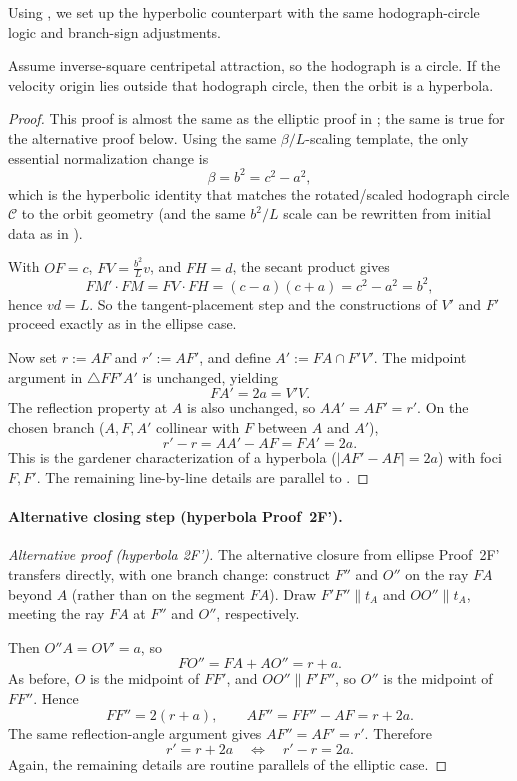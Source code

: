 Using , we set up the hyperbolic counterpart with the same hodograph-circle logic and branch-sign adjustments.

\begin{proposition}
Assume inverse-square centripetal attraction, so the hodograph is a circle. If the velocity origin lies outside that hodograph circle, then the orbit is a hyperbola.
\end{proposition}

\begin{proof}
This proof is almost the same as the elliptic proof in ; the same is true for the alternative proof below. Using the same \(\beta/L\)-scaling template, the only essential normalization change is
\[
  \beta=b^2=c^2-a^2,
\]
which is the hyperbolic identity that matches the rotated/scaled hodograph circle \(\mathcal C\) to the orbit geometry (and the same \(b^2/L\) scale can be rewritten from initial data as in ).

With \(OF=c\), \(FV=\frac{b^2}{L}v\), and \(FH=d\), the secant product gives
\[
  FM'\cdot FM=FV\cdot FH=(c-a)(c+a)=c^2-a^2=b^2,
\]
hence \(vd=L\). So the tangent-placement step and the constructions of \(V'\) and \(F'\) proceed exactly as in the ellipse case.

Now set \(r:=AF\) and \(r':=AF'\), and define \(A':=FA\cap F'V'\). The midpoint argument in \(\triangle FF'A'\) is unchanged, yielding
\[
  FA'=2a=V'V.
\]
The reflection property at \(A\) is also unchanged, so \(AA'=AF'=r'\). On the chosen branch (\(A,F,A'\) collinear with \(F\) between \(A\) and \(A'\)),
\[
  r'-r = AA'-AF = FA' = 2a.
\]
This is the gardener characterization of a hyperbola (\(\lvert AF'-AF\rvert=2a\)) with foci \(F,F'\). The remaining line-by-line details are parallel to .
\end{proof}

\paragraph{Alternative closing step (hyperbola Proof~2F').}
\begin{proof}[Alternative proof (hyperbola 2F')]
The alternative closure from ellipse Proof~2F' transfers directly, with one branch change: construct \(F''\) and \(O''\) on the ray \(FA\) beyond \(A\) (rather than on the segment \(FA\)). Draw \(F'F''\parallel t_A\) and \(OO''\parallel t_A\), meeting the ray \(FA\) at \(F''\) and \(O''\), respectively.

Then \(O''A=OV'=a\), so
\[
  FO''=FA+AO''=r+a.
\]
As before, \(O\) is the midpoint of \(FF'\), and \(OO''\parallel F'F''\), so \(O''\) is the midpoint of \(FF''\). Hence
\[
  FF''=2(r+a),
  \qquad
  AF''=FF''-AF=r+2a.
\]
The same reflection-angle argument gives \(AF''=AF'=r'\). Therefore
\[
  r'=r+2a
  \quad\Longleftrightarrow\quad
  r'-r=2a.
\]
Again, the remaining details are routine parallels of the elliptic case.
\end{proof}

